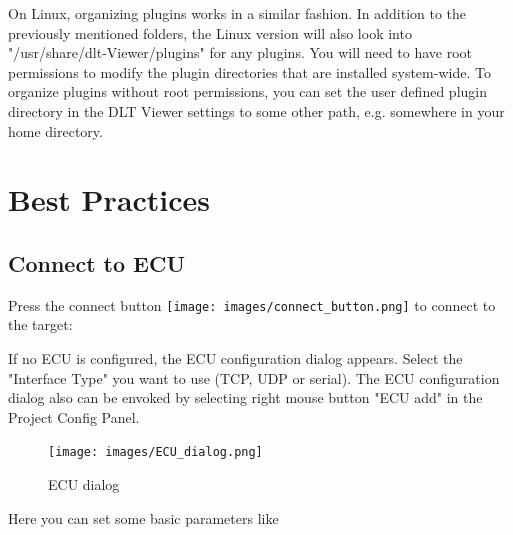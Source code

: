 \documentclass[a4paper,11pt]{article}
\begin{document}
On Linux, organizing plugins works in a similar fashion. In addition to the previously mentioned folders,
the Linux version will also look into "/usr/share/dlt-Viewer/plugins" for any plugins.
You will need to have root permissions to modify the plugin directories that are installed system-wide.
To organize plugins without root permissions, you can set the user defined plugin directory in the DLT Viewer
settings to some other path, e.g. somewhere in your home directory.



\section{Best Practices}

\subsection{Connect to ECU}
\label{connecttoecu}

Press the connect button \texttt{[image: images/connect\_button.png]} to connect to the target:\linebreak

If no ECU is configured, the ECU configuration dialog appears.
Select the "Interface Type" you want to use (TCP, UDP or serial).
The ECU configuration dialog also can be envoked by selecting right mouse button "ECU add"
in the Project Config Panel.

\begin{figure}[H]
 \centering
 \texttt{[image: images/ECU\_dialog.png]}
 \caption{ECU dialog}
 \label{fig:ecudialog}
\end{figure}



Here you can set some basic parameters like
\end{document}
